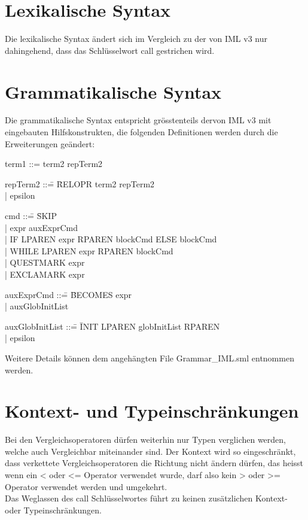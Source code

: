 \documentclass[a4paper,10pt]{article}
\begin{document}
\section{Lexikalische Syntax}
Die lexikalische Syntax \"andert sich im Vergleich zu der von IML v3
nur dahingehend, dass das Schl\"usselwort call gestrichen wird.
\section{Grammatikalische Syntax}
Die grammatikalische Syntax entspricht gr\"osstenteils dervon IML v3 mit eingebauten Hilfskonstrukten, die folgenden Definitionen werden durch die Erweiterungen ge\"andert:

\begin{tabbing}
term1 ::= term2 repTerm2
\end{tabbing}
\begin{tabbing}
repTerm2 ::\= = \= RELOPR term2 repTerm2\\
\> |\> epsilon
\end{tabbing}
\begin{tabbing}
cmd ::\= = \= SKIP\\
\> |\> expr auxExprCmd\\
\> |\> IF LPAREN expr RPAREN blockCmd ELSE blockCmd\\
\> |\> WHILE LPAREN expr RPAREN blockCmd\\
\> |\> QUESTMARK expr\\
\> |\> EXCLAMARK expr\\
\end{tabbing}
\begin{tabbing}
auxExprCmd ::\= = \= BECOMES expr\\
\> |\> auxGlobInitList\\
\end{tabbing}
\begin{tabbing}
auxGlobInitList ::\= = \= INIT LPAREN globInitList RPAREN\\
\> |\> epsilon\\
\end{tabbing}
Weitere Details k\"onnen dem angeh\"angten File Grammar\_IML.sml entnommen werden. 
\section{Kontext- und Typeinschr\"ankungen}
Bei den Vergleichsoperatoren dürfen weiterhin nur Typen verglichen werden, welche auch Vergleichbar miteinander sind. Der Kontext wird so
eingeschränkt, dass verkettete Vergleichsoperatoren die Richtung nicht \"andern d\"urfen, das heisst wenn ein < oder <= Operator verwendet wurde, darf also kein > oder >= Operator verwendet werden und umgekehrt.\\
Das Weglassen des call Schl\"usselwortes führt zu keinen zus\"atzlichen Kontext- oder Typeinschr\"ankungen.
\end{document}
